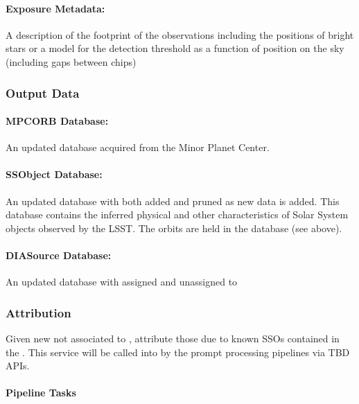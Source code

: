 \paragraph*{Exposure Metadata:} A description of the footprint of the observations including the positions of bright stars or a model for the detection threshold as a function of position on the sky (including gaps between chips)


\subsubsection{Output Data}

\paragraph*{MPCORB Database: } An updated \MPCORB database acquired from the Minor Planet Center.

\paragraph*{SSObject Database: } An updated \SSObject database with \SSObjects both added and pruned as new data is added. This database contains the inferred physical and other characteristics of Solar System objects observed by the LSST. The orbits are held in the \MPCORB database (see above).

\paragraph*{DIASource Database:} An updated \DIASource database with \DIASources assigned and unassigned to \SSObjects


\subsubsection{Attribution}

Given new \DIASources not associated to \DIAObjects, attribute those due to known SSOs contained in the \MPCORB. This service will be called into by the prompt processing pipelines via TBD APIs.

\paragraph{Pipeline Tasks}

